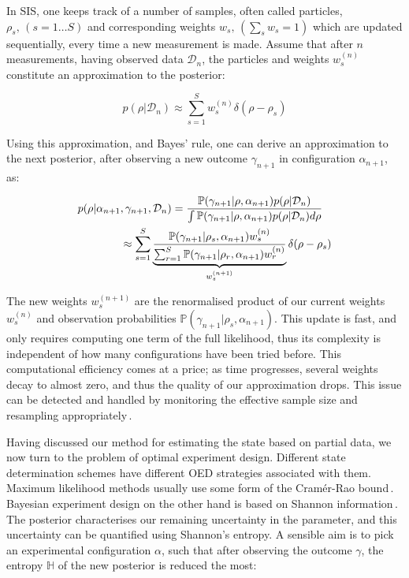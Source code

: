 \documentclass[aps,twocolumn,prl]{revtex4-1}
\newcommand{\param}{{\rho}} \newcommand{\data}{\mathcal{D}}
\newcommand{\config}{\alpha} \newcommand{\configset}{\mathcal{A}}
\newcommand{\outcome}{\gamma} \newcommand{\ie}{i.\,e.\ }
\begin{document}
In SIS, one keeps track of a number of samples, often called particles, $\param_s,\, (s=1\ldots S)$ and corresponding weights $w_s, \, \left( \sum_s w_s = 1 \right)$  which are updated sequentially, every time a new measurement is made. Assume that after $n$ measurements, having observed data $\data_n$, the particles and weights  $w^{(n)}_s$ constitute an approximation to the posterior:

\begin{equation}
	p(\param\vert\data_n)\approx \sum_{s=1}^{S}w^{(n)}_s\delta(\param-\param_s)\label{eqn:SISapprox}
\end{equation}

Using this approximation, and Bayes' rule, one can derive an approximation to the next posterior, after observing a new outcome $\outcome_{n+1}$ in configuration $\config_{n+1}$, as:

\begin{align}
	p(\param\vert\config_{n+1}&,\outcome_{n+1},\data_n) = \frac{\mathbb{P}(\outcome_{n+1}\vert\param,\config_{n+1})p(\param\vert\data_n)}{\int \mathbb{P}(\outcome_{n+1}\vert\param,\config_{n+1})p(\param\vert\data_n) d\param}\label{eqn:SISupdate}\\
	&\approx \sum_{s=1}^{S}\underbrace{\frac{\mathbb{P}(\outcome_{n+1}\vert\param_s,\config_{n+1})w^{(n)}_s}{\sum_{r=1}^{S}\mathbb{P}(\outcome_{n+1}\vert\param_r,\config_{n+1})w^{(n)}_r}}_{w^{(n+1)}_s}\delta(\param-\param_s)\notag
\end{align}

The new weights $w^{(n+1)}_s$ are the renormalised product of our current weights $w^{(n)}_s$ and observation probabilities $\mathbb{P}(\outcome_{n+1}\vert\param_s,\config_{n+1})$. This update is fast, and only requires computing one term of the full likelihood, thus its complexity is independent of how many configurations have been tried before. This computational efficiency comes at a price; as time progresses, several weights decay to almost zero, and thus the quality of our approximation drops. This issue can be detected and handled by monitoring the effective sample size and resampling appropriately\,\cite{SMCBook}.

Having discussed our method for estimating the state based on partial data, we now turn to the problem of optimal experiment design. Different state determination schemes have different OED strategies associated with them. Maximum likelihood methods usually use some form of the Cram\'{e}r-Rao bound\,\cite{OEDFirst,OEDAverage}. Bayesian experiment design on the other hand is based on Shannon information\,\cite{MUBFirst,ExactInformation}. The posterior characterises our remaining uncertainty in the parameter, and this uncertainty can be quantified using Shannon's entropy. A sensible aim is to pick an experimental configuration $\config$, such that after observing the outcome $\outcome$, the entropy $\mathbb{H}$ of the new posterior is reduced the most:
\end{document}
